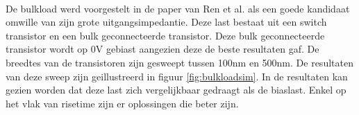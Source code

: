 \paragraph{}
De bulkload werd voorgestelt in de paper van Ren et al. \cite{bulkload} als een goede kandidaat omwille van zijn grote uitgangsimpedantie. Deze last bestaat uit een switch transistor en een bulk geconnecteerde transistor. Deze bulk geconnecteerde transistor wordt op 0V gebiast aangezien deze de beste resultaten gaf. De breedtes van de transistoren zijn gesweept tussen 100nm en 500nm. De resultaten van deze sweep zijn geillustreerd in figuur \ref{fig:bulkloadsim}. In de resultaten kan gezien worden dat deze last zich vergelijkbaar gedraagt als de biaslast. Enkel op het vlak van risetime zijn er oplossingen die beter zijn.

